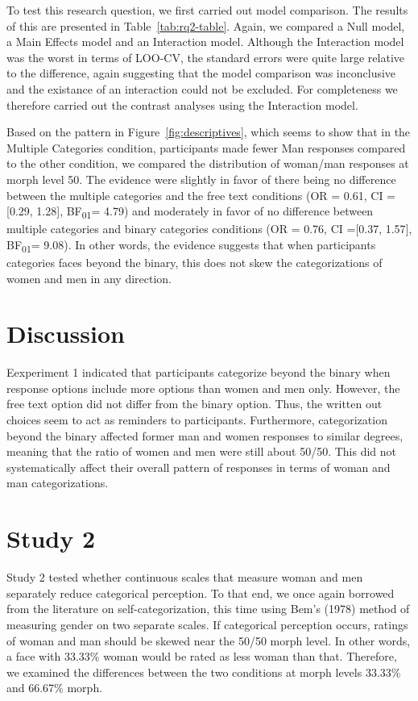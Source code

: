 \documentclass[
  man]{apa7}
\begin{document}
To test this research question, we first carried out model comparison. The results of this are presented in Table~\ref{tab:rq2-table}. Again, we compared a Null model, a Main Effects model and an Interaction model. Although the Interaction model was the worst in terms of LOO-CV, the standard errors were quite large relative to the difference, again suggesting that the model comparison was inconclusive and the existance of an interaction could not be excluded. For completeness we therefore carried out the contrast analyses using the Interaction model.

Based on the pattern in Figure~\ref{fig:descriptives}, which seems to show that in the Multiple Categories condition, participants made fewer Man responses compared to the other condition, we compared the distribution of woman/man responses at morph level 50. The evidence were slightly in favor of there being no difference between the multiple categories and the free text conditions (OR = 0.61, CI ={[}0.29, 1.28{]}, BF\textsubscript{01}= 4.79) and moderately in favor of no difference between multiple categories and binary categories conditions (OR = 0.76, CI ={[}0.37, 1.57{]}, BF\textsubscript{01}= 9.08). In other words, the evidence suggests that when participants categories faces beyond the binary, this does not skew the categorizations of women and men in any direction.

\hypertarget{discussion}{%
\section{Discussion}\label{discussion}}

Eexperiment 1 indicated that participants categorize beyond the binary when response options include more options than women and men only. However, the free text option did not differ from the binary option. Thus, the written out choices seem to act as reminders to participants. Furthermore, categorization beyond the binary affected former man and women responses to similar degrees, meaning that the ratio of women and men were still about 50/50. This did not systematically affect their overall pattern of responses in terms of woman and man categorizations.

\hypertarget{study-2}{%
\section{Study 2}\label{study-2}}

Study 2 tested whether continuous scales that measure woman and men separately reduce categorical perception. To that end, we once again borrowed from the literature on self-categorization, this time using Bem's (1978) method of measuring gender on two separate scales.
If categorical perception occurs, ratings of woman and man should be skewed near the 50/50 morph level. In other words, a face with 33.33\% woman would be rated as less woman than that. Therefore, we examined the differences between the two conditions at morph levels 33.33\% and 66.67\% morph.
\end{document}

